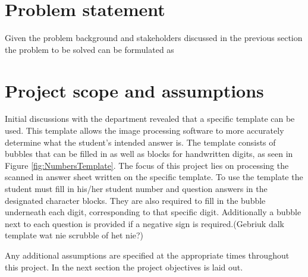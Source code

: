 \section{Problem statement}
\label{sec:problemStatement}

Given the problem background and stakeholders discussed in the previous section the problem to be solved can be formulated as
\newline
\newline
\noindent{}

\section{Project scope and assumptions}\label{sec:Scope}
Initial discussions with the department revealed that a specific template can be used. This template allows the image processing software to more accurately determine what the student's intended answer is. The template consists of bubbles that can be filled in as well as blocks for handwritten digits, as seen in Figure \ref{fig:NumbersTemplate}. The focus of this project lies on processing the scanned in answer sheet written on the specific template. To use the template the student must fill in his/her student number and question answers in the designated character blocks. They are also required to fill in the bubble underneath each digit, corresponding to that specific digit. Additionally a bubble next to each question is provided if a negative sign is required.(Gebriuk dalk template wat nie scrubble of het nie?)

Any additional assumptions are specified at the appropriate times throughout this project. In the next section the project objectives is laid out.

